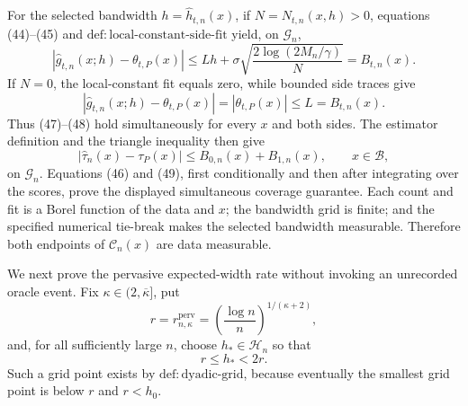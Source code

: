 For the selected bandwidth \(h=\widehat h_{t,n}(x)\), if \(N=N_{t,n}(x,h)>0\), equations (44)--(45) and \(\mathrm{def:local\text{-}constant\text{-}side\text{-}fit}\) yield, on \(\mathcal G_n\),
\[
 |\widehat g_{t,n}(x;h)-\theta_{t,P}(x)|
 \le Lh+\sigma\sqrt{\frac{2\log(2M_n/\gamma)}{N}}
 =B_{t,n}(x). \tag{47}
\]
If \(N=0\), the local-constant fit equals zero, while bounded side traces give
\[
 |\widehat g_{t,n}(x;h)-\theta_{t,P}(x)|
 =|\theta_{t,P}(x)|\le L=B_{t,n}(x). \tag{48}
\]
Thus (47)--(48) hold simultaneously for every \(x\) and both sides.  The estimator definition and the triangle inequality then give
\[
 |\widehat\tau_n(x)-\tau_P(x)|
 \le B_{0,n}(x)+B_{1,n}(x),\qquad x\in\mathcal B, \tag{49}
\]
on \(\mathcal G_n\).  Equations (46) and (49), first conditionally and then after integrating over the scores, prove the displayed simultaneous coverage guarantee.  Each count and fit is a Borel function of the data and \(x\); the bandwidth grid is finite; and the specified numerical tie-break makes the selected bandwidth measurable.  Therefore both endpoints of \(\mathcal C_n(x)\) are data measurable.

We next prove the pervasive expected-width rate without invoking an unrecorded oracle event.  Fix \(\kappa\in(2,\overline\kappa]\), put
\[
 r=r_{n,\kappa}^{\mathrm{perv}}
   =\left(\frac{\log n}{n}\right)^{1/(\kappa+2)},
\]
and, for all sufficiently large \(n\), choose \(h_*\in\mathcal H_n\) so that
\[
 r\le h_*<2r. \tag{50}
\]
Such a grid point exists by \(\mathrm{def:dyadic\text{-}grid}\), because eventually the smallest grid point is below \(r\) and \(r<h_0\).


